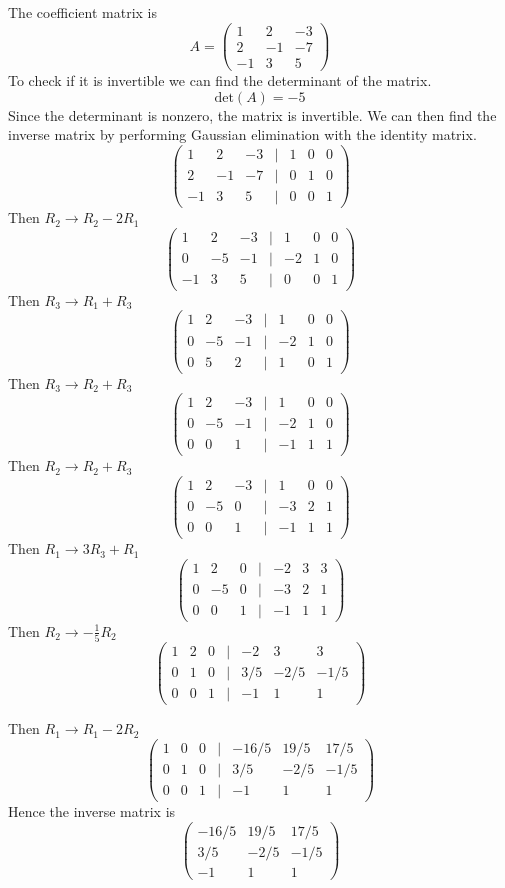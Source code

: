 \documentclass{article}
\begin{document}
\subsection{}
The coefficient matrix is
\[A = \begin{pmatrix}
    1&2&-3  \\ 2&-1&-7 \\ -1&3&5
\end{pmatrix}\]
To check if it is invertible we can find the determinant of the matrix. 
\[\text{det}(A) = -5\] Since the determinant is nonzero, the matrix is invertible. We can then find the inverse matrix by performing Gaussian elimination with the identity matrix.
\[\begin{pmatrix}
    1&2&-3&|&1&0&0 \\ 2&-1&-7&|&0&1&0 \\ -1&3&5&|&0&0&1
\end{pmatrix}\]
Then \(R_2 \rightarrow R_2 - 2R_1\)
\[\begin{pmatrix}
    1&2&-3&|&1&0&0 \\ 0&-5&-1&|&-2&1&0 \\ -1&3&5&|&0&0&1
\end{pmatrix}\]
Then \(R_3 \rightarrow R_1 + R_3\)
\[\begin{pmatrix}
    1&2&-3&|&1&0&0 \\ 0&-5&-1&|&-2&1&0 \\ 0&5&2&|&1&0&1
\end{pmatrix}\]
Then \(R_3 \rightarrow R_2 + R_3\)
\[\begin{pmatrix}
    1&2&-3&|&1&0&0 \\ 0&-5&-1&|&-2&1&0 \\ 0&0&1&|&-1&1&1
\end{pmatrix}\]
Then \(R_2 \rightarrow R_2 + R_3\)
\[\begin{pmatrix}
    1&2&-3&|&1&0&0 \\ 0&-5&0&|&-3&2&1 \\ 0&0&1&|&-1&1&1
\end{pmatrix}\]
Then \(R_1 \rightarrow 3R_3 + R_1\)
\[\begin{pmatrix}
    1&2&0&|&-2&3&3 \\ 0&-5&0&|&-3&2&1 \\ 0&0&1&|&-1&1&1
\end{pmatrix}\]
Then \(R_2 \rightarrow -\frac{1}{5}R_2\)
\[\begin{pmatrix}
    1&2&0&|&-2&3&3 \\ 0&1&0&|&3/5&-2/5&-1/5 \\ 0&0&1&|&-1&1&1
\end{pmatrix}\]

Then \(R_1 \rightarrow R_1 - 2R_2\)
\[\begin{pmatrix}
    1&0&0&|&-16/5&19/5&17/5 \\ 0&1&0&|&3/5&-2/5&-1/5 \\ 0&0&1&|&-1&1&1
\end{pmatrix}\]
Hence the inverse matrix is 
\[\begin{pmatrix}
    -16/5&19/5&17/5 \\ 3/5&-2/5&-1/5 \\ -1&1&1
\end{pmatrix}\]
\end{document}
